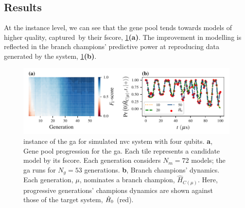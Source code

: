 \subsection{Results}
At the \gls{instance} level, we can see that the gene pool tends towards models of higher quality, 
    captured\footnotemark \ by their \gls{fscore}, \cref{fig:nv_ga_instance}\textbf{(a)}. 
The improvement in modelling is reflected in the branch champions' predictive power at 
    reproducing data generated by the system, \cref{fig:nv_ga_instance}\textbf{(b)}. 
\begin{figure}
    \begin{center}
        \includegraphics{experimental_study/figures/nv_ga_instance_horiz.pdf}
    \end{center}
    \caption[Instance of genetic algorithm for simulated nitrogen-vacancy centre system with four qubits]{
        \Gls{instance} of the \acrfull{ga} for simulated \acrlong{nvc} system with four qubits.       
        \textbf{a}, Gene pool progression for the \gls{ga}. Each tile represents a candidate model by its \gls{fscore}. 
        Each generation considers $N_m=72$ models; the \gls{ga} runs for $N_g=53$ generations. 
        \textbf{b}, Branch champions' dynamics. 
        Each generation, $\mu$, nominates a branch champion, $\hat{H}_{C(\mu)}$. 
        Here, progressive generations' champions dynamics are shown against those of the target system, $\hat{H}_0$ (red). 
    }
    \label{fig:nv_ga_instance}
\end{figure}
\par 

